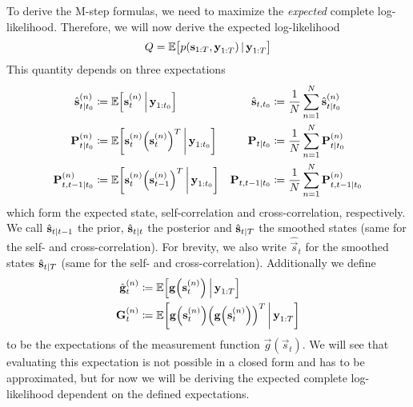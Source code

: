 	To derive the M-step formulas, we need to maximize the \emph{expected} complete log-likelihood. Therefore, we will now derive the expected log-likelihood
	\begin{equation*}
		Q = \mathbb{E}\big[ p(\boldsymbol{\mathrm{s}}_{1:T}, \boldsymbol{\mathrm{y}}_{1:T}) \,\vert\, \boldsymbol{\mathrm{y}}_{1:T} \big]
	\end{equation*}
	This quantity depends on three expectations
	\begin{align*}
		\hat{\boldsymbol{\mathrm{s}}}_{t \vert t_0}^{(n)}  & \coloneqq \mathbb{E}\Big[\boldsymbol{\mathrm{s}}_t^{(n)} \,\Big\vert\, \boldsymbol{\mathrm{y}}_{1:t_0}\Big]                                      & \hat{\boldsymbol{\mathrm{s}}}_{t, t_0}           & \coloneqq \frac{1}{N} \sum_{n = 1}^{N} \hat{\boldsymbol{\mathrm{s}}}_{t \vert t_0}^{(n)}  \\
		\boldsymbol{\mathrm{P}}_{t \vert t_0}^{(n)}        & \coloneqq \mathbb{E}\bigg[\boldsymbol{\mathrm{s}}_t^{(n)} \Big(\boldsymbol{\mathrm{s}}_t^{(n)}\Big)^T \,\bigg\vert\, \boldsymbol{\mathrm{y}}_{1:t_0}\bigg]       & \boldsymbol{\mathrm{P}}_{t \vert t_0}        & \coloneqq \frac{1}{N} \sum_{n = 1}^{N} \boldsymbol{\mathrm{P}}_{t \vert t_0}^{(n)}        \\
		\boldsymbol{\mathrm{P}}_{t, t - 1 \vert t_0}^{(n)} & \coloneqq \mathbb{E}\bigg[\boldsymbol{\mathrm{s}}_t^{(n)} \Big(\boldsymbol{\mathrm{s}}_{t - 1}^{(n)}\Big)^T \,\bigg\vert\, \boldsymbol{\mathrm{y}}_{1:t_0}\bigg] & \boldsymbol{\mathrm{P}}_{t, t - 1 \vert t_0} & \coloneqq \frac{1}{N} \sum_{n = 1}^{N} \boldsymbol{\mathrm{P}}_{t, t - 1 \vert t_0}^{(n)}
	\end{align*}
	which form the expected state, self-correlation and cross-correlation, respectively. We call \( \hat{\boldsymbol{\mathrm{s}}}_{t \vert t - 1} \) the prior, \( \hat{\boldsymbol{\mathrm{s}}}_{t \vert t} \) the posterior and \( \hat{\boldsymbol{\mathrm{s}}}_{t \vert T} \) the smoothed states (same for the self- and cross-correlation). For brevity, we also write \( \hat{\vec{s}}_t \) for the smoothed states \( \hat{\boldsymbol{\mathrm{s}}}_{t \vert T} \) (same for the self- and cross-correlation). Additionally we define
	\begin{align}
		\hat{\boldsymbol{\mathrm{g}}}_t^{(n)} & \coloneqq \mathbb{E}\Big[\boldsymbol{\mathrm{g}}\Big(\boldsymbol{\mathrm{s}}_t^{(n)}\Big) \,\Big\vert\, \boldsymbol{\mathrm{y}}_{1:T}\Big]    \label{eq:expectedMeasurement}                                              \\
		\boldsymbol{\mathrm{G}}_t^{(n)}       & \coloneqq \mathbb{E}\bigg[\boldsymbol{\mathrm{g}}\Big(\boldsymbol{\mathrm{s}}_t^{(n)}\Big) \Big(\boldsymbol{\mathrm{g}}\Big(\boldsymbol{\mathrm{s}}_t^{(n)}\Big)\Big)^T \,\bigg\vert\, \boldsymbol{\mathrm{y}}_{1:T}\bigg]    \label{eq:expectedMeasurementMat}
	\end{align}
	to be the expectations of the measurement function \( \vec{g}(\vec{s}_t) \). We will see that evaluating this expectation is not possible in a closed form and has to be approximated, but for now we will be deriving the expected complete log-likelihood dependent on the defined expectations.

